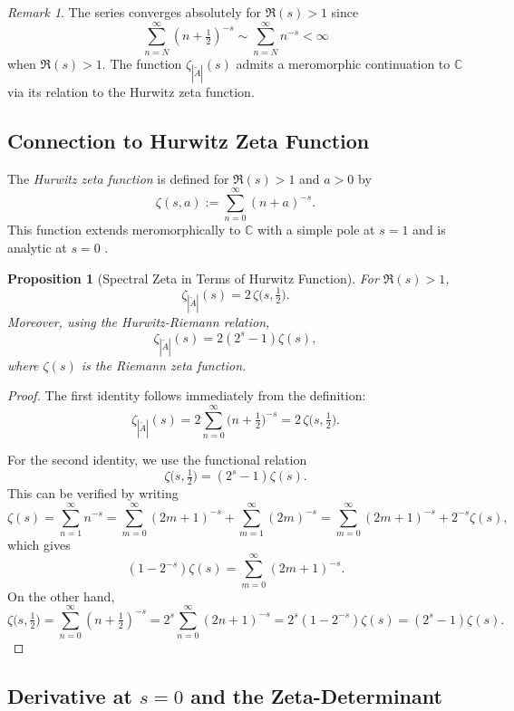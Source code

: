 \documentclass[11pt]{amsart}
\newtheorem{proposition}[theorem]{Proposition}
\theoremstyle{definition}
\theoremstyle{remark}
\newtheorem{remark}[theorem]{Remark}
\begin{document}
\begin{remark}
The series converges absolutely for $\Re(s) > 1$ since
\[
\sum_{n=N}^{\infty} (n + \tfrac{1}{2})^{-s} \sim \sum_{n=N}^{\infty} n^{-s} < \infty
\]
when $\Re(s) > 1$. The function $\zeta_{|\widetilde{A}|}(s)$ admits a meromorphic continuation to $\mathbb{C}$ via its relation to the Hurwitz zeta function.
\end{remark}

\subsection{Connection to Hurwitz Zeta Function}

The \emph{Hurwitz zeta function} is defined for $\Re(s) > 1$ and $a > 0$ by
\[
\zeta(s, a) := \sum_{n=0}^{\infty} (n + a)^{-s}.
\]
This function extends meromorphically to $\mathbb{C}$ with a simple pole at $s=1$ and is analytic at $s=0$ \cite{apostol}.

\begin{proposition}[Spectral Zeta in Terms of Hurwitz Function]
\label{prop:zeta-hurwitz}
For $\Re(s) > 1$,
\[
\zeta_{|\widetilde{A}|}(s) = 2 \, \zeta\bigl(s, \tfrac{1}{2}\bigr).
\]
Moreover, using the Hurwitz-Riemann relation,
\[
\zeta_{|\widetilde{A}|}(s) = 2(2^s - 1) \zeta(s),
\]
where $\zeta(s)$ is the Riemann zeta function.
\end{proposition}

\begin{proof}
The first identity follows immediately from the definition:
\[
\zeta_{|\widetilde{A}|}(s) = 2 \sum_{n=0}^{\infty} \bigl(n + \tfrac{1}{2}\bigr)^{-s} = 2 \, \zeta\bigl(s, \tfrac{1}{2}\bigr).
\]

For the second identity, we use the functional relation \cite{apostol}
\[
\zeta\bigl(s, \tfrac{1}{2}\bigr) = (2^s - 1) \zeta(s).
\]
This can be verified by writing
\[
\zeta(s) = \sum_{n=1}^{\infty} n^{-s} = \sum_{m=0}^{\infty} (2m+1)^{-s} + \sum_{m=1}^{\infty} (2m)^{-s} = \sum_{m=0}^{\infty} (2m+1)^{-s} + 2^{-s}\zeta(s),
\]
which gives
\[
(1 - 2^{-s})\zeta(s) = \sum_{m=0}^{\infty} (2m+1)^{-s}.
\]
On the other hand,
\[
\zeta\bigl(s, \tfrac{1}{2}\bigr) = \sum_{n=0}^{\infty} (n + \tfrac{1}{2})^{-s} = 2^s \sum_{n=0}^{\infty} (2n+1)^{-s} = 2^s(1-2^{-s})\zeta(s) = (2^s - 1)\zeta(s).
\]
\end{proof}

\subsection{Derivative at \texorpdfstring{$s=0$}{s=0} and the Zeta-Determinant}
\end{document}
